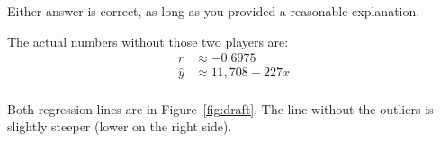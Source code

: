 \documentclass[letterpaper]{exam}
\begin{document}
\begin{questions}
\begin{parts}
\begin{solution}
          Either answer is correct, as long as you provided a reasonable
          explanation.

          The actual numbers without those two players are:
          \begin{align*}
            r       & \approx -0.6975 \\
            \hat{y} & \approx 11,708 -227 x \\
          \end{align*}

          Both regression lines are in Figure~\ref{fig:draft}.  The line without
          the outliers is slightly steeper (lower on the right side).
        \end{solution}
      \end{parts}


  \end{questions}
\end{document}
